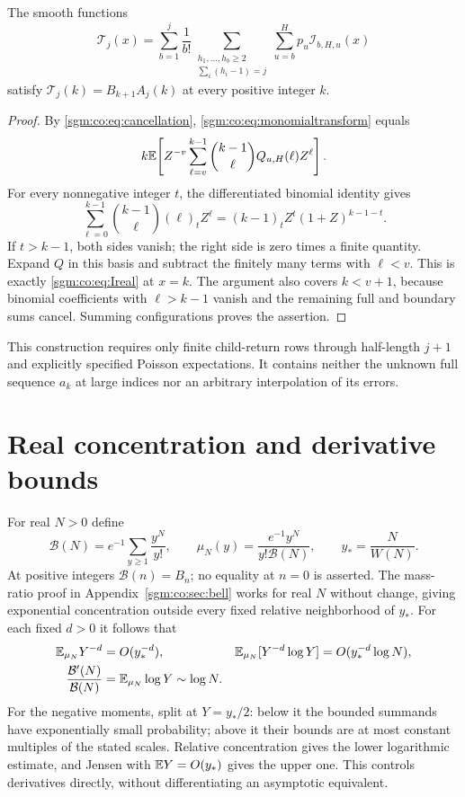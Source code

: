 \documentclass[11pt,letterpaper]{article}
\theoremstyle{remark}\newtheorem{remark}[theorem]{Remark}
\theoremstyle{definition}\newtheorem{definition}[theorem]{Definition}
\begin{document}
\begin{proposition}\label{sgm:co:prop:interpolation}
The smooth functions
\begin{equation}\label{sgm:co:eq:Treal}
 \mathcal T_j(x)=\sum_{b=1}^j\frac1{b!}
 \sum_{\substack{h_1,\ldots,h_b\ge2\\\sum_i(h_i-1)=j}}
       \sum_{u=b}^H p_u\mathcal I_{b,H,u}(x)
\end{equation}
satisfy $\mathcal T_j(k)=B_{k+1}A_j(k)$ at every positive integer $k$.
\end{proposition}
\begin{proof}
By \eqref{sgm:co:eq:cancellation}, \eqref{sgm:co:eq:monomialtransform} equals
\[
 k\mathbb E\!\left[Z^{-v}\sum_{\ell=v}^{k-1}
              \binom{k-1}{\ell}Q_{u,H}(\ell)Z^\ell\right].
\]
For every nonnegative integer $t$, the differentiated binomial identity gives
\[
 \sum_{\ell=0}^{k-1}\binom{k-1}{\ell}(\ell)_tZ^\ell
       =(k-1)_t Z^t(1+Z)^{k-1-t}.
\]
If $t>k-1$, both sides vanish; the right side is zero times a finite quantity. Expand $Q$ in this basis and subtract the finitely many terms with $\ell<v$. This is exactly \eqref{sgm:co:eq:Ireal} at $x=k$. The argument also covers $k<v+1$, because binomial coefficients with $\ell>k-1$ vanish and the remaining full and boundary sums cancel. Summing configurations proves the assertion.
\end{proof}
This construction requires only finite child-return rows through half-length $j+1$ and explicitly specified Poisson expectations. It contains neither the unknown full sequence $a_k$ at large indices nor an arbitrary interpolation of its errors.

\section{Real concentration and derivative bounds}\label{sgm:co:sec:derivatives}
For real $N>0$ define
\[
 \mathcal B(N)=e^{-1}\sum_{y\ge1}\frac{y^N}{y!},\qquad
 \mu_N(y)=\frac{e^{-1}y^N}{y!\mathcal B(N)},\qquad
 y_* =\frac{N}{W(N)}.
\]
At positive integers $\mathcal B(n)=B_n$; no equality at $n=0$ is asserted. The mass-ratio proof in Appendix~\ref{sgm:co:sec:bell} works for real $N$ without change, giving exponential concentration outside every fixed relative neighborhood of $y_*$. For each fixed $d>0$ it follows that
\begin{align}
 \mathbb E_{\mu_N}Y^{-d}&=O(y_*^{-d}),&
 \mathbb E_{\mu_N}[Y^{-d}\log Y]&=O(y_*^{-d}\log N),\label{sgm:co:eq:negmom}\\
 \frac{\mathcal B'(N)}{\mathcal B(N)}&=\mathbb E_{\mu_N}\log Y\sim\log N.\label{sgm:co:eq:realderivative}
\end{align}
For the negative moments, split at $Y=y_*/2$: below it the bounded summands have exponentially small probability; above it their bounds are at most constant multiples of the stated scales. Relative concentration gives the lower logarithmic estimate, and Jensen with $\mathbb E Y=O(y_*)$ gives the upper one. This controls derivatives directly, without differentiating an asymptotic equivalent.
\end{document}

